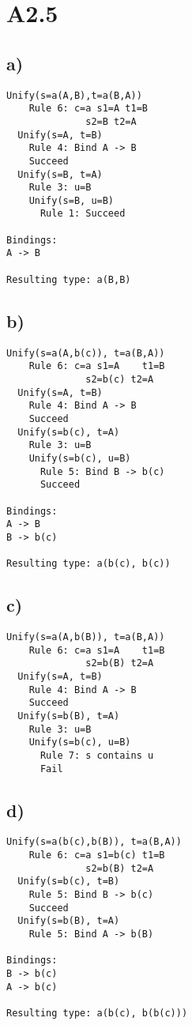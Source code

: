 \section*{A2.5}

\subsection*{a)}
\begin{verbatim}
Unify(s=a(A,B),t=a(B,A))
	Rule 6: c=a s1=A t1=B
              s2=B t2=A
  Unify(s=A, t=B)
    Rule 4: Bind A -> B
    Succeed
  Unify(s=B, t=A)
    Rule 3: u=B
    Unify(s=B, u=B)
      Rule 1: Succeed

Bindings:
A -> B

Resulting type: a(B,B)
\end{verbatim}

\subsection*{b)}
\begin{verbatim}
Unify(s=a(A,b(c)), t=a(B,A))
	Rule 6: c=a s1=A    t1=B
              s2=b(c) t2=A
  Unify(s=A, t=B)
    Rule 4: Bind A -> B
    Succeed
  Unify(s=b(c), t=A)
    Rule 3: u=B
    Unify(s=b(c), u=B)
      Rule 5: Bind B -> b(c) 
      Succeed

Bindings:
A -> B
B -> b(c)

Resulting type: a(b(c), b(c))
\end{verbatim}

\subsection*{c)}
\begin{verbatim}
Unify(s=a(A,b(B)), t=a(B,A))
	Rule 6: c=a s1=A    t1=B
              s2=b(B) t2=A
  Unify(s=A, t=B)
    Rule 4: Bind A -> B
    Succeed
  Unify(s=b(B), t=A)
    Rule 3: u=B
    Unify(s=b(c), u=B)
      Rule 7: s contains u
      Fail 
\end{verbatim}

\subsection*{d)}
\begin{verbatim}
Unify(s=a(b(c),b(B)), t=a(B,A))
	Rule 6: c=a s1=b(c) t1=B
              s2=b(B) t2=A
  Unify(s=b(c), t=B)
    Rule 5: Bind B -> b(c)
    Succeed
  Unify(s=b(B), t=A)
    Rule 5: Bind A -> b(B)

Bindings:
B -> b(c)
A -> b(c)

Resulting type: a(b(c), b(b(c)))
\end{verbatim}

